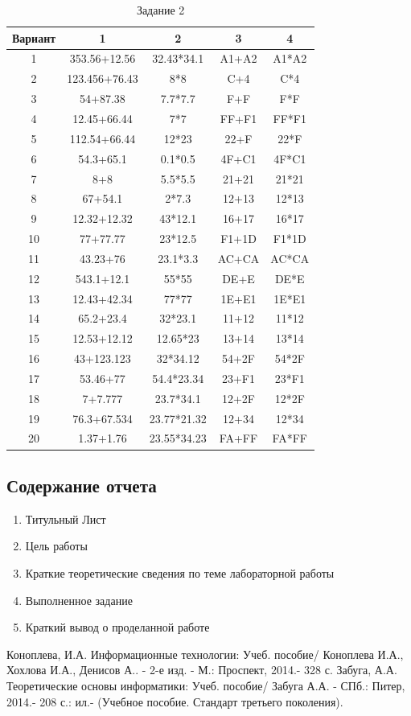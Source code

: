\begin{table}[h!]
  \caption{Задание 2}
  \begin{center}\label{tab:task2_2}
\begin{tabular}{|c|c|c|c|c|}
\hline
Вариант & 1 & 2 & 3 & 4\tabularnewline
\hline
1 & 353.56+12.56 & 32.43{*}34.1 & A1+A2 & A1{*}A2\tabularnewline
\hline
2 & 123.456+76.43 & 8{*}8 & C+4 & C{*}4\tabularnewline
\hline
3 & 54+87.38 & 7.7{*}7.7 & F+F & F{*}F\tabularnewline
\hline
4 & 12.45+66.44 & 7{*}7 & FF+F1 & FF{*}F1\tabularnewline
\hline
5 & 112.54+66.44 & 12{*}23 & 22+F & 22{*}F\tabularnewline
\hline
6 & 54.3+65.1 & 0.1{*}0.5 & 4F+C1 & 4F{*}C1\tabularnewline
\hline
7 & 8+8 & 5.5{*}5.5 & 21+21 & 21{*}21\tabularnewline
\hline
8 & 67+54.1 & 2{*}7.3 & 12+13 & 12{*}13\tabularnewline
\hline
9 & 12.32+12.32 & 43{*}12.1 & 16+17 & 16{*}17\tabularnewline
\hline
10 & 77+77.77 & 23{*}12.5 & F1+1D & F1{*}1D\tabularnewline
\hline
11 & 43.23+76 & 23.1{*}3.3 & AC+CA & AC{*}CA\tabularnewline
\hline
12 & 543.1+12.1 & 55{*}55 & DE+E & DE{*}E\tabularnewline
\hline
13 & 12.43+42.34 & 77{*}77 & 1E+E1 & 1E{*}E1\tabularnewline
\hline
14 & 65.2+23.4 & 32{*}23.1 & 11+12 & 11{*}12\tabularnewline
\hline
15 & 12.53+12.12 & 12.65{*}23 & 13+14 & 13{*}14\tabularnewline
\hline
16 & 43+123.123 & 32{*}34.12 & 54+2F & 54{*}2F\tabularnewline
\hline
17 & 53.46+77 & 54.4{*}23.34 & 23+F1 & 23{*}F1\tabularnewline
\hline
18 & 7+7.777 & 23.7{*}34.1 & 12+2F & 12{*}2F\tabularnewline
\hline
19 & 76.3+67.534 & 23.77{*}21.32 & 12+34 & 12{*}34\tabularnewline
\hline
20 & 1.37+1.76 & 23.55{*}34.23 & FA+FF & FA{*}FF\tabularnewline
\hline
\end{tabular}
\end{center}
\end{table}

\newpage
\subsection{Содержание отчета}
\begin{enumerate}
  \item Титульный Лист
  \item Цель работы
  \item Краткие теоретические сведения по теме лабораторной работы
  \item Выполненное задание
  \item Краткий вывод о проделанной работе
\end{enumerate}

\begin{thebibliography}{3}
  Коноплева, И.А. Информационные технологии: Учеб. пособие/ Коноплева И.А., Хохлова И.А., Денисов А.. - 2-е изд. - М.: Проспект, 2014.- 328 с.
Забуга, А.А. Теоретические основы информатики: Учеб. пособие/ Забуга А.А. - СПб.: Питер, 2014.- 208 с.: ил.- (Учебное пособие. Стандарт третьего поколения).
\end{thebibliography}

%
